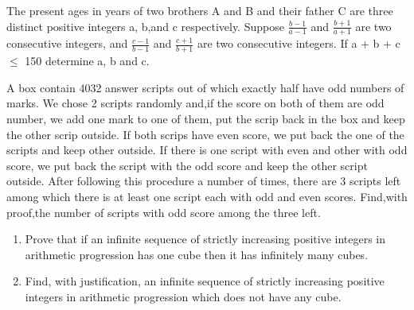 \item The present ages in years of two brothers A and B and their father C are three distinct positive integers a, b,and c respectively. Suppose $\frac{b-1}{a-1}$ and $\frac{b+1}{a+1}$ are two consecutive integers, and $\frac{c-1}{b-1}$ and 
$\frac{c+1}{b+1}$ are two consecutive integers. If a + b + c $\leq$ 150 determine a, b and c.

\item A box contain 4032 answer scripts out of which exactly half have odd numbers of marks. We chose 2 scripts randomly and,if the score on both of them are odd number, we add one mark to one of them, put the scrip back in the box and keep the other scrip outside. If both scrips have even score, we put back the one of the scripts and keep other outside. If there is one script with even and other with odd score, we put back the script with the odd score and keep the other script outside. After following this procedure a number of times, there are 3 scripts left among which there is at least one script each with odd and even scores. Find,with proof,the number of scripts with odd score among the three left.

\item 
\begin{enumerate}
\item Prove that if an infinite sequence of strictly increasing positive integers in arithmetic progression has one cube then it has infinitely many cubes.
\item Find, with justification, an infinite sequence of strictly increasing positive integers in arithmetic progression which does not have any cube.
\end{enumerate}


